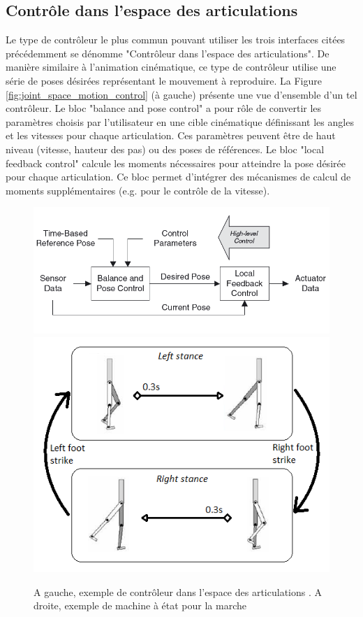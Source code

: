 \documentclass[runningheads,a4paper]{llncs}
\begin{document}
\subsection{Contrôle dans l'espace des articulations} 
Le type de contrôleur le plus commun pouvant utiliser les trois interfaces citées précédemment se dénomme "Contrôleur dans l'espace des articulations".
De manière similaire à l'animation cinématique, ce type de contrôleur utilise une série de poses désirées représentant le mouvement à reproduire. La Figure \ref{fig:joint_space_motion_control} (à gauche) présente une vue d'ensemble d'un tel contrôleur. Le bloc "balance and pose control" a pour rôle de convertir les paramètres choisis par l'utilisateur en une cible cinématique définissant les angles et les vitesses pour chaque articulation. Ces paramètres peuvent être de haut niveau (vitesse, hauteur des pas) ou des poses de références. Le bloc "local feedback control" calcule les moments nécessaires pour atteindre la pose désirée pour chaque articulation. Ce bloc permet d'intégrer des mécanismes de calcul de moments supplémentaires (e.g. pour le contrôle de la vitesse). 
\vspace*{-0.5cm}
\begin{figure}[h]
\centering
\includegraphics[scale=0.4]{joint_space_motion_control.png}
\includegraphics[scale=0.5]{state_machine.png}
\caption{A gauche, exemple de contrôleur dans l'espace des articulations \cite{geijtenbeek2012interactive}. A droite, exemple de machine à état pour la marche \cite{yin2007simbicon}}
\label{fig:joint_space_motion_control}
\label{fig:state_machine}
\end{figure}
\end{document}
